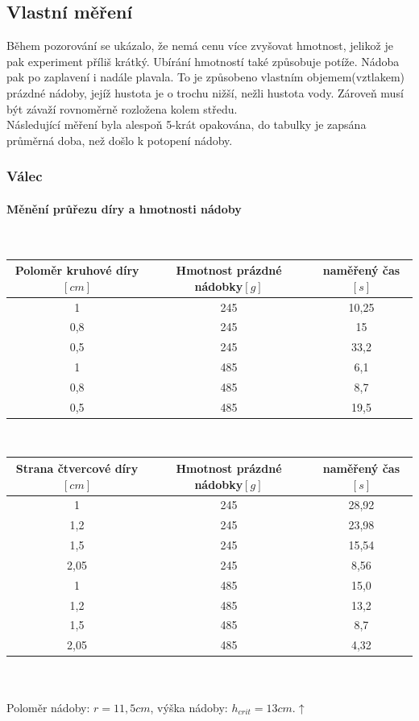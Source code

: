 \documentclass[14pt,a4paper]{article}
\begin{document}
\subsection{Vlastní měření}
Během pozorování se ukázalo, že nemá cenu více zvyšovat hmotnost, jelikož je pak experiment příliš krátký. Ubírání hmotností také způsobuje potíže. Nádoba pak po zaplavení i nadále plavala. To je způsobeno vlastním objemem(vztlakem) prázdné nádoby, jejíž hustota je o trochu nižší, nežli hustota vody. Zároveň musí být závaží  rovnoměrně rozložena kolem středu.\\
Následující měření byla alespoň 5-krát opakována, do tabulky je zapsána průměrná doba, než došlo k potopení nádoby.
\newpage
\subsubsection{Válec}
\label{mereni valec}
\paragraph{Měnění průřezu díry a hmotnosti nádoby}\mbox{}\\
\begin{tabular}{|c|c|c|}
\hline 
Poloměr kruhové díry$[cm]$&Hmotnost prázdné nádobky$[g]$&naměřený čas $[s]$\\ 
\hline 
\hline 
1 & 245 & 10,25\\ 
\hline 
0,8 & 245 & 15\\ 
\hline 
0,5 & 245 & 33,2\\ 
\hline 
1 & 485 & 6,1\\ 
\hline 
0,8 & 485 & 8,7\\ 
\hline 
0,5 & 485 & 19,5\\ 
\hline 
\end{tabular}
\\
\begin{tabular}{|c|c|c|}
\hline 
Strana čtvercové díry$[cm]$&Hmotnost prázdné nádobky$[g]$&naměřený čas $[s]$\\ 
\hline 
\hline 
1 & 245 & 28,92\\ 
\hline 
1,2 & 245 & 23,98\\ 
\hline 
1,5 & 245 & 15,54\\ 
\hline 
2,05 & 245 & 8,56\\ 
\hline 
1 & 485 & 15,0\\ 
\hline 
1,2 & 485 & 13,2\\ 
\hline 
1,5 & 485 & 8,7\\ 
\hline 
2,05 & 485 & 4,32\\ 
\hline 
\end{tabular}
\\\\Poloměr nádoby: $r=11,5cm$, výška nádoby: $h_{crit}=13cm$.$\uparrow$
\end{document}

